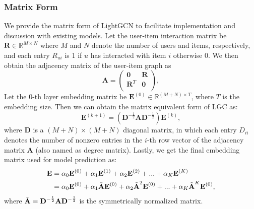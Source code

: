 \documentclass[sigconf]{acmart}
\theoremstyle{definition}
\begin{document}
\subsubsection{Matrix Form} We provide the matrix form of LightGCN to facilitate implementation and discussion with existing models. Let the user-item interaction matrix be $\textbf{R} \in \mathbb{R}^{M\times N}$ where $M$ and $N$ denote the number of users and items, respectively, and each entry $R_{ui}$ is 1 if $u$ has interacted with item $i$ otherwise 0. We then obtain the adjacency matrix of the user-item graph as 
\begin{equation}
    \textbf{A}=
    \left(\begin{matrix}
    \textbf{0} & \textbf{R}\\
    \textbf{R}^{T} & \textbf{0}\\
    \end{matrix} \right),
\end{equation}
Let the $0$-th layer embedding matrix be $\textbf{E}^{(0)} \in \mathbb{R}^{ (M+N) \times T} $, where $T$ is the embedding size.  
Then we can obtain the matrix equivalent form of LGC as:
\begin{equation}
    \textbf{E}^{(k+1)} = (\textbf{D}^{-\frac{1}{2}} \textbf{A} \textbf{D}^{-\frac{1}{2}}) \textbf{E}^{(k)},
\end{equation}
where $\textbf{D}$ is a $(M+N)\times (M+N)$ diagonal matrix, in which each entry $D_{ii}$ denotes the number of nonzero entries in the $i$-th row vector of the  adjacency matrix $\textbf{A}$ (also named as degree matrix). Lastly, we get the final embedding matrix used for model prediction as:
\begin{equation}\label{eq:E_LGCN}
\begin{aligned}
    \textbf{E} &= \alpha_0 \textbf{E}^{(0)} + \alpha_1 \textbf{E}^{(1)} + \alpha_2 \textbf{E}^{(2)} + ... + \alpha_K \textbf{E}^{(K)} \\
    &= \alpha_0 \textbf{E}^{(0)} + \alpha_1 \Tilde{\textbf{A}}\textbf{E}^{(0)} + \alpha_2 \Tilde{\textbf{A}}^2\textbf{E}^{(0)} + ... + \alpha_K \Tilde{\textbf{A}}^K\textbf{E}^{(0)},
\end{aligned}
\end{equation}
where $\Tilde{\textbf{A}} = \textbf{D}^{-\frac{1}{2}} \textbf{A} \textbf{D}^{-\frac{1}{2}}$ is the symmetrically normalized matrix.
\end{document}
